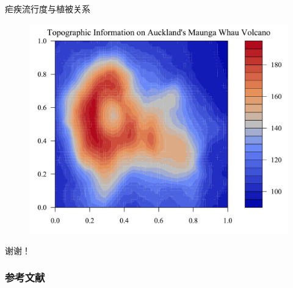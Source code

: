 \documentclass[11pt,compress,xcolor=x11names,UTF8]{ctexbeamer}
\begin{document}
\begin{frame}{疟疾流行度与植被关系}
\begin{figure}
\centering
\includegraphics[width=.8\textwidth]{volcano03}
\end{figure}
\end{frame}



\begin{frame}

  \centerline{\Huge\color{red} 谢谢！ }

\end{frame}



\begin{frame}[allowframebreaks]
\frametitle{参考文献}


\end{frame}
\end{document}
